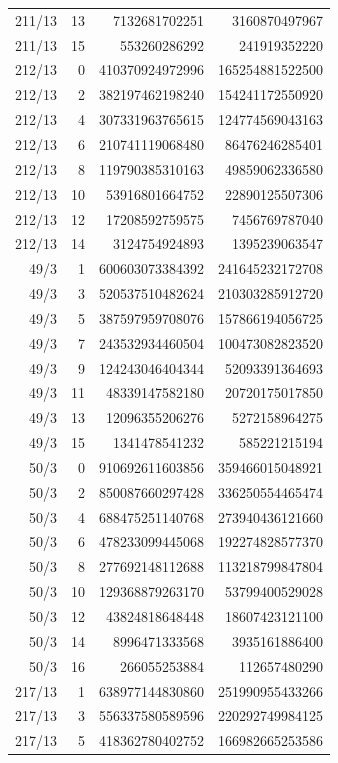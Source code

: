 \begin{longtable}{@{}rrrr@{}}
211/13 & 13 & 7132681702251 & 3160870497967\\
211/13 & 15 & 553260286292 & 241919352220\\
212/13 & 0 & 410370924972996 & 165254881522500\\
212/13 & 2 & 382197462198240 & 154241172550920\\
212/13 & 4 & 307331963765615 & 124774569043163\\
212/13 & 6 & 210741119068480 & 86476246285401\\
212/13 & 8 & 119790385310163 & 49859062336580\\
212/13 & 10 & 53916801664752 & 22890125507306\\
212/13 & 12 & 17208592759575 & 7456769787040\\
212/13 & 14 & 3124754924893 & 1395239063547\\
49/3 & 1 & 600603073384392 & 241645232172708\\
49/3 & 3 & 520537510482624 & 210303285912720\\
49/3 & 5 & 387597959708076 & 157866194056725\\
49/3 & 7 & 243532934460504 & 100473082823520\\
49/3 & 9 & 124243046404344 & 52093391364693\\
49/3 & 11 & 48339147582180 & 20720175017850\\
49/3 & 13 & 12096355206276 & 5272158964275\\
49/3 & 15 & 1341478541232 & 585221215194\\
50/3 & 0 & 910692611603856 & 359466015048921\\
50/3 & 2 & 850087660297428 & 336250554465474\\
50/3 & 4 & 688475251140768 & 273940436121660\\
50/3 & 6 & 478233099445068 & 192274828577370\\
50/3 & 8 & 277692148112688 & 113218799847804\\
50/3 & 10 & 129368879263170 & 53799400529028\\
50/3 & 12 & 43824818648448 & 18607423121100\\
50/3 & 14 & 8996471333568 & 3935161886400\\
50/3 & 16 & 266055253884 & 112657480290\\
217/13 & 1 & 638977144830860 & 251990955433266\\
217/13 & 3 & 556337580589596 & 220292749984125\\
217/13 & 5 & 418362780402752 & 166982665253586\\

\end{longtable}
